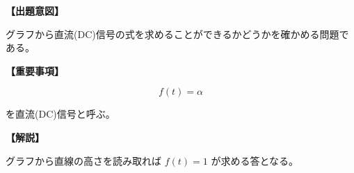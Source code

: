 \noindent \textbf{【出題意図】}

\noindent グラフから直流(DC)信号の式を求めることができるかどうかを確かめる問題である。

\vspace{1em}
\noindent \textbf{【重要事項】}

\[
f(t) = \alpha
\]

\medskip
\noindent を直流(DC)信号と呼ぶ。


\vspace{1em}
\noindent \textbf{【解説】}

\noindent グラフから直線の高さを読み取れば $f(t) = 1$ が求める答となる。
